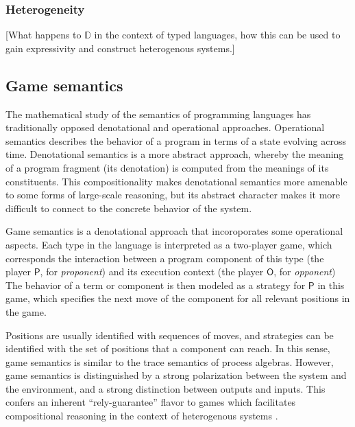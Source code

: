 \documentclass[acmsmall,timestamp,review,anonymous]{acmart}
\newcommand{\kw}[1]{\ensuremath{ \mathsf{#1} }}
\begin{document}

\subsubsection{Heterogeneity} %

[What happens to $\mathbb{D}$ in the context of typed languages,
how this can be used to gain expressivity and construct heterogenous systems.]



\subsection{Game semantics} %


The mathematical study of the semantics of programming languages
has traditionally opposed denotational and operational approaches.
Operational semantics describes
the behavior of a program in terms of
a state evolving across time.
Denotational semantics is a more abstract approach,
whereby the meaning of a program fragment (its denotation)
is computed from the meanings of its constituents.
This compositionality makes denotational semantics
more amenable to some forms of large-scale reasoning,
but its abstract character makes it more difficult
to connect to the concrete behavior of the system.

Game semantics is a denotational approach that
incoroporates some operational aspects.
Each type in the language
is interpreted as a two-player game,
which corresponds the interaction
between a program component of this type
(the player \kw{P}, for \emph{proponent})
and its execution context
(the player \kw{O}, for \emph{opponent})
The behavior of a term or component
is then modeled as a strategy for \kw{P} in this game,
which specifies the next move of the component
for all relevant positions in the game.

Positions are usually identified with sequences of moves,
and strategies can be identified with the set of positions
that a component can reach.
In this sense,
game semantics is similar to
the trace semantics of process algebras.
However, game semantics is distinguished
by a strong polarization between
the system and the environment,
and a strong distinction between outputs and inputs.
This confers an inherent ``rely-guarantee'' flavor
to games which facilitates compositional reasoning
in the context of heterogenous systems \cite{cspgs}.
\end{document}
